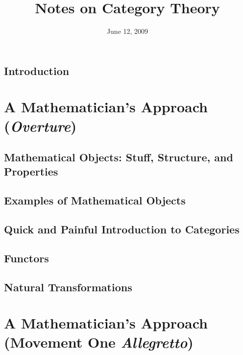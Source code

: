 \documentclass{article}
\title{Notes on Category Theory}
\date{June 12, 2009} %
\theoremstyle{plain}
\theoremstyle{definition}
\begin{document}
\maketitle
\tableofcontents
\listoftables
\section{Introduction}



\chapter{A Mathematician's Approach (\emph{Overture})}
\section{Mathematical Objects: Stuff, Structure, and Properties}

\section{Examples of Mathematical Objects}

\section{Quick and Painful Introduction to Categories}

\section{Functors}

\section{Natural Transformations}


\chapter{A Mathematician's Approach (Movement One \emph{Allegretto})}
\end{document}
